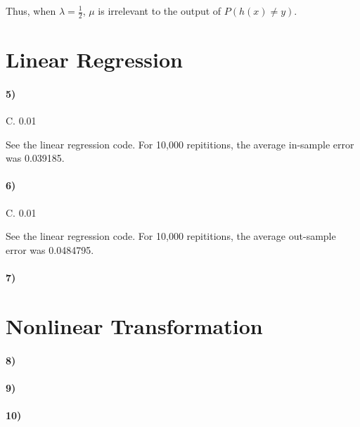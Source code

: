 \documentclass[10pt,letter]{article}
\begin{document}
	Thus, when $\lambda = \frac{1}{2}$, $\mu$ is irrelevant to the output of $P(h(x) \neq y)$.

\section*{Linear Regression}

\paragraph{5)} C. 0.01

	See the linear regression code. For 10,000 repititions, the average in-sample error was 0.039185. 

\paragraph{6)} C. 0.01

	See the linear regression code. For 10,000 repititions, the average out-sample error was 0.0484795.

\paragraph{7)}

\section*{Nonlinear Transformation}

\paragraph{8)}

\paragraph{9)}

\paragraph{10)}
\end{document}
